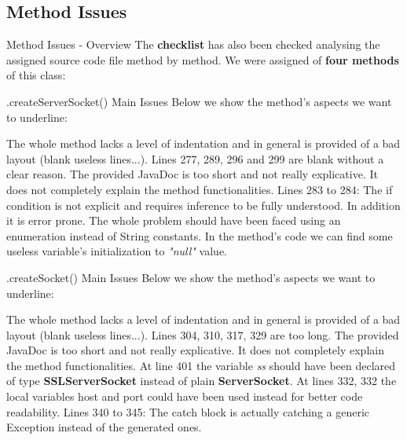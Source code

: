 \documentclass{../common/latex_classes/pdf_presentation}
\begin{document}
	\subsection{Method Issues}
	
	\begin{frame}{Method Issues - Overview}
		The \textbf{checklist} has also been checked analysing the assigned source code file method by method.
		We were assigned of \textbf{four methods} of this class:
		\begin{itemize}
		\end{itemize}
	\end{frame}
	
	\begin{frame}{.createServerSocket() Main Issues}
		Below we show the method's aspects we want to underline:
		\begin{itemize}
			 The whole method 	lacks a level of indentation and in general is provided of a bad layout (blank useless lines...).
			 Lines 277, 289, 296 and 299 are blank without a clear reason.
			 The provided JavaDoc is too short and not really explicative. It does not completely explain the method functionalities.
			 Lines 283 to 284: The if condition is not explicit and requires inference to be fully understood. In addition it is error prone. The whole problem should have been faced using an enumeration instead of String constants.
			 In the method's code we can find some useless variable's initialization to \textit{"null"} value.
		\end{itemize}
	\end{frame}
	
	\begin{frame}{.createSocket() Main Issues}
		Below we show the method's aspects we want to underline:
		\begin{itemize}
			 The whole method 	lacks a level of indentation and in general is provided of a bad layout (blank useless lines...).
			 Lines 304, 310, 317, 329 are too long.
			 The provided JavaDoc is too short and not really explicative. It does not completely explain the method functionalities.
			 At line 401 the variable \textit{ss} should have been declared of type \textbf{SSLServerSocket} instead of plain \textbf{ServerSocket}.
			 At lines 332, 332 the local variables host and port could have been used instead for better code readability.
			 Lines 340 to 345: The catch block is actually catching a generic Exception instead of the generated ones.
		\end{itemize}
	\end{frame}
	
\end{document}
